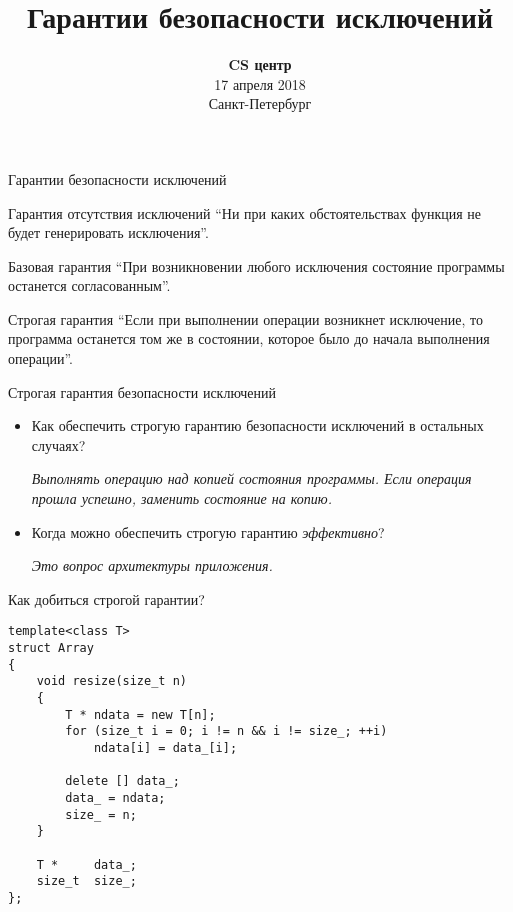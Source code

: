 \documentclass{beamer}
\title{Гарантии безопасности исключений}
\date{
   \textbf{CS центр}\\
   17 апреля 2018 \\
   Санкт-Петербург
}
\begin{document}
\begin{frame} 
  \titlepage
\end{frame}
\newcommand{\fakeitem}{{\color{MOOCBlue}\textbullet}\ \ }



\begin{frame}[fragile]{Гарантии безопасности исключений}
    \begin{block}{Гарантия отсутствия исключений}
            “Ни при каких обстоятельствах функция  не будет генерировать исключения”.
    \end{block}\pause
    
    \begin{block}{Базовая гарантия}
            “При возникновении любого исключения 
            состояние программы останется
            согласованным”.
    \end{block}\pause

    \begin{block}{Строгая гарантия}
            “Если при выполнении операции возникнет исключение,  
            то программа останется том же в состоянии,  которое было до начала выполнения
            операции”.
    \end{block}
\end{frame}
\begin{frame}[fragile]{Строгая гарантия безопасности исключений}
    \begin{itemize}
        \pitem В каком случае мы не можем обеспечить строгую 
        гарантию безопасности исключений?
            
            \pause \medskip
            \emph{При наличии взаимодействия со внешним окружением.}
            \medskip\pause
        
        \item Как обеспечить строгую гарантию безопасности исключений  в остальных случаях?
            
            \pause \medskip
            \emph{Выполнять операцию над копией состояния программы.  Если операция прошла успешно, заменить состояние на копию.}
            \medskip\pause
            
        \item Когда можно обеспечить строгую гарантию {\em эффективно}?
        
            \pause \medskip
            \emph{Это вопрос архитектуры приложения.}
            
    \end{itemize}
\end{frame}
\begin{frame}[fragile]{Как добиться строгой гарантии?}
    \begin{lstlisting}
template<class T>
struct Array 
{
    void resize(size_t n) 
    {
        T * ndata = new T[n];
        for (size_t i = 0; i != n && i != size_; ++i)
            ndata[i] = data_[i];

        delete [] data_;
        data_ = ndata;
        size_ = n;    
    }

    T *     data_;
    size_t  size_;
};
    \end{lstlisting}
\end{frame}
\end{document}
